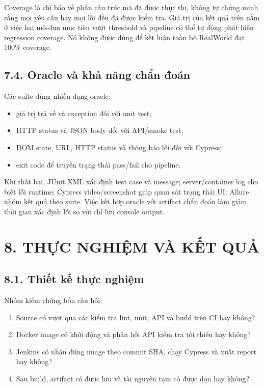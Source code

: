 \documentclass[
  vietnamese,
  12pt,
  a4paper,
  oneside]{report}
\providecommand{\tightlist}{%
  \setlength{\itemsep}{0pt}\setlength{\parskip}{0pt}}
\begin{document}
Coverage là chỉ báo về phần cấu trúc mã đã được thực thi, không tự chứng
minh rằng mọi yêu cầu hay mọi lỗi đều đã được kiểm tra. Giá trị của kết
quả trên nằm ở việc hai mô-đun mục tiêu vượt threshold và pipeline có
thể tự động phát hiện regression coverage. Nó không được dùng để kết
luận toàn bộ RealWorld đạt 100\% coverage.

\section{7.4. Oracle và khả năng chẩn
đoán}\label{74-oracle-vuxe0-khux1ea3-nux103ng-chux1ea9n-ux111ouxe1n}

Các suite dùng nhiều dạng oracle:

\begin{itemize}
\tightlist
\item
  giá trị trả về và exception đối với unit test;
\item
  HTTP status và JSON body đối với API/smoke test;
\item
  DOM state, URL, HTTP status và thông báo lỗi đối với Cypress;
\item
  exit code để truyền trạng thái pass/fail cho pipeline.
\end{itemize}

Khi thất bại, JUnit XML xác định test case và message; server/container
log cho biết lỗi runtime; Cypress video/screenshot giúp quan sát trạng
thái UI; Allure nhóm kết quả theo suite. Việc kết hợp oracle với
artifact chẩn đoán làm giảm thời gian xác định lỗi so với chỉ lưu
console output.

\chapter{8. THỰC NGHIỆM VÀ KẾT
QUẢ}\label{8-thux1ef1c-nghiux1ec7m-vuxe0-kux1ebft-quux1ea3}

\section{8.1. Thiết kế thực
nghiệm}\label{81-thiux1ebft-kux1ebf-thux1ef1c-nghiux1ec7m}

Nhóm kiểm chứng bốn câu hỏi:

\begin{enumerate}
\def\labelenumi{\arabic{enumi}.}
\tightlist
\item
  Source có vượt qua các kiểm tra lint, unit, API và build trên CI hay
  không?
\item
  Docker image có khởi động và phản hồi API kiểm tra tối thiểu hay
  không?
\item
  Jenkins có nhận đúng image theo commit SHA, chạy Cypress và xuất
  report hay không?
\item
  Sau build, artifact có được lưu và tài nguyên tạm có được dọn hay
  không?
\end{enumerate}
\end{document}
